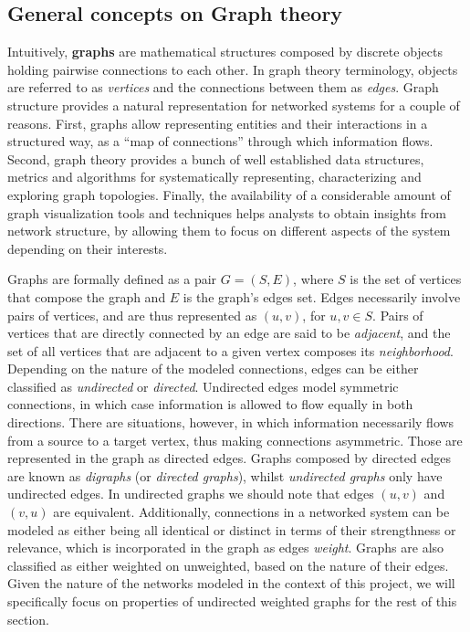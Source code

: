 \subsection{General concepts on Graph theory}

Intuitively, \textbf{graphs} are mathematical structures composed by discrete objects holding pairwise connections to each other. 
In graph theory terminology, objects are referred to as \textit{vertices} and the connections between them as \textit{edges}.
Graph structure provides a natural representation for networked systems for a couple of reasons.
First, graphs allow representing entities and their interactions in a structured way, as a ``map of connections'' through which information flows.
Second, graph theory provides a bunch of well established data structures, metrics and algorithms for systematically representing, characterizing and exploring graph topologies.
Finally, the availability of a considerable amount of graph visualization tools and techniques helps analysts to obtain insights from network structure, by allowing them to focus on different aspects of the system depending on their interests.

Graphs are formally defined as a pair $G=(S,E)$, where $S$ is the set of vertices that compose the graph and $E$ is the graph's edges set. 
%
Edges necessarily involve pairs of vertices, and are thus represented as $(u,v)$, for $u,v \in S$.
Pairs of vertices that are directly connected by an edge are said to be \textit{adjacent}, and the set of all vertices that are adjacent to a given vertex composes its \textit{neighborhood}.
%
Depending on the nature of the modeled connections, edges can be either classified as \textit{undirected} or \textit{directed}.
Undirected edges model symmetric connections, in which case information is allowed to flow equally in both directions.
There are situations, however, in which information necessarily flows from a source to a target vertex, thus making connections asymmetric.
Those are represented in the graph as directed edges.
Graphs composed by directed edges are known as \textit{digraphs} (or \textit{directed graphs}), whilst \textit{undirected graphs} only have undirected edges.
In undirected graphs we should note that edges $(u,v)$ and $(v,u)$ are equivalent.
%
Additionally, connections in a networked system can be modeled as either being all identical or distinct in terms of their strengthness or relevance, which is incorporated in the graph as edges \textit{weight}.
Graphs are also classified as either weighted on unweighted, based on the nature of their edges.
%
Given the nature of the networks modeled in the context of this project, we will specifically focus on properties of undirected weighted graphs for the rest of this section.


